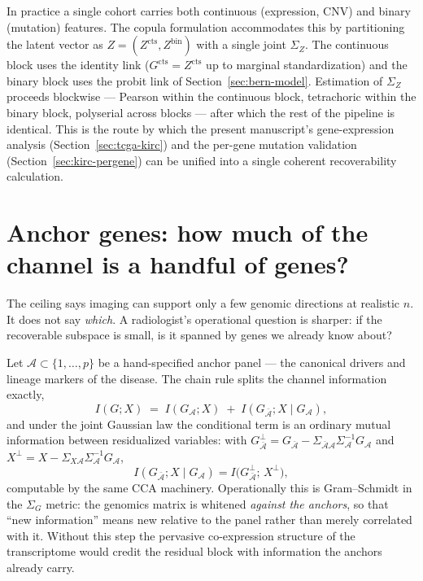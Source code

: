 \documentclass{article}
\newcommand{\Sg}{\Sigma_{G}}
\begin{document}
In practice a single cohort carries both continuous (expression, CNV) and
binary (mutation) features. The copula formulation accommodates this by
partitioning the latent vector as $Z = (Z^{\mathrm{cts}}, Z^{\mathrm{bin}})$
with a single joint $\Sigma_Z$. The continuous block uses the identity link
($G^{\mathrm{cts}} = Z^{\mathrm{cts}}$ up to marginal standardization) and the
binary block uses the probit link of Section~\ref{sec:bern-model}. Estimation
of $\Sigma_Z$ proceeds blockwise --- Pearson within the continuous block,
tetrachoric within the binary block, polyserial across blocks --- after which
the rest of the pipeline is identical. This is the route by which the present
manuscript's gene-expression analysis (Section~\ref{sec:tcga-kirc}) and the
per-gene mutation validation (Section~\ref{sec:kirc-pergene}) can be unified
into a single coherent recoverability calculation.

\section{Anchor genes: how much of the channel is a handful of genes?}
\label{sec:anchors}

The ceiling says imaging can support only a few genomic directions at realistic
$n$. It does not say \emph{which}. A radiologist's operational question is
sharper: if the recoverable subspace is small, is it spanned by genes we already
know about?

Let $\mathcal{A}\subset\{1,\dots,p\}$ be a hand-specified anchor panel --- the
canonical drivers and lineage markers of the disease. The chain rule splits the
channel information exactly,
\begin{equation}
I(G;X) \;=\; I(G_\mathcal{A};X) \;+\; I(G_{\bar{\mathcal{A}}};X \mid G_\mathcal{A}),
\label{eq:chainrule}
\end{equation}
and under the joint Gaussian law the conditional term is an ordinary mutual
information between residualized variables: with
$G^{\perp}_{\bar{\mathcal{A}}} = G_{\bar{\mathcal{A}}}
 - \Sigma_{\bar{\mathcal{A}}\mathcal{A}}\Sigma_{\mathcal{A}}^{-1}G_\mathcal{A}$
and $X^{\perp} = X - \Sigma_{X\mathcal{A}}\Sigma_{\mathcal{A}}^{-1}G_\mathcal{A}$,
\begin{equation}
I(G_{\bar{\mathcal{A}}};X\mid G_\mathcal{A})
= I\big(G^{\perp}_{\bar{\mathcal{A}}};\,X^{\perp}\big),
\label{eq:conditional-mi}
\end{equation}
computable by the same CCA machinery. Operationally this is Gram--Schmidt in the
$\Sg$ metric: the genomics matrix is whitened \emph{against the anchors}, so
that ``new information'' means new relative to the panel rather than merely
correlated with it. Without this step the pervasive co-expression structure of
the transcriptome would credit the residual block with information the anchors
already carry.
\end{document}
